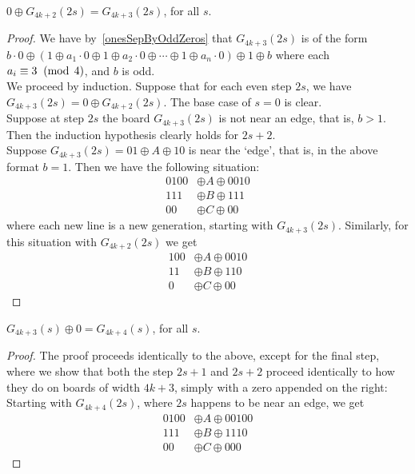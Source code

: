 \documentclass[12pt,letterpaper]{article}
\begin{document}
\addtocounter{prop}{1}
\begin{innerProp}
  $0\oplus G_{4k+2}(2s)=G_{4k+3}(2s)$, for all $s$.
\end{innerProp}
\begin{proof}
  We have by~\cref{onesSepByOddZeros} that $G_{4k+3}(2s)$ is of the form $b\cdot 0 \oplus (1 \oplus a_1\cdot 0 \oplus 1\oplus a_2\cdot 0\oplus\cdots \oplus 1\oplus a_n\cdot 0) \oplus 1 \oplus b$ where each $a_i\equiv 3 \;\;(\operatorname{mod}\;4)$, and $b$ is odd. \\
  We proceed by induction. Suppose that for each even step $2s$, we have $G_{4k+3}(2s)=0\oplus G_{4k+2}(2s)$. The base case of $s=0$ is clear. \\
  Suppose at step $2s$ the board $G_{4k+3}(2s)$ is not near an edge, that is, $b>1$. Then the induction hypothesis clearly holds for $2s+2$. \\
  Suppose $G_{4k+3}(2s)=01\oplus A\oplus 10$ is near the `edge', that is, in the above format $b=1$. Then we have the following situation:
  \begin{align*}
    0100&\oplus A \oplus 0010 \\
    111&\oplus B \oplus 111 \\
    00&\oplus C \oplus 00
  \end{align*}
  where each new line is a new generation, starting with $G_{4k+3}(2s)$. Similarly, for this situation with $G_{4k+2}(2s)$ we get
  \begin{align*}
    100 &\oplus A\oplus 0010 \\
    11 &\oplus B\oplus 110 \\
    0 &\oplus C\oplus 00
  \end{align*}
\end{proof}
\begin{innerProp}
  $G_{4k+3}(s)\oplus 0=G_{4k+4}(s)$, for all $s$.
\end{innerProp}
\begin{proof}
  The proof proceeds identically to the above, except for the final step, where we show that both the step $2s+1$ and $2s+2$ proceed identically to how they do on boards of width $4k+3$, simply with a zero appended on the right: \\
  Starting with $G_{4k+4}(2s)$, where $2s$ happens to be near an edge, we get
  \begin{align*}
    0100&\oplus A \oplus 00100 \\
    111&\oplus B \oplus 1110 \\
    00&\oplus C \oplus 000 
  \end{align*}
\end{proof}
\end{document}
